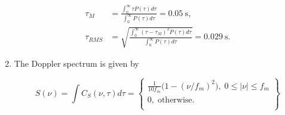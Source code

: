 \documentclass [a4paper, 11pt] {article}
\begin{document}
\begin{solution}
\begin{enumerate}
            \begin{align}
                \tau_M &= \frac{\int_0^\infty \tau P(\tau) d\tau}{\int_0^\infty P(\tau) d\tau} = \SI{0.05}{\second}, \\
                \tau_{RMS} & = \sqrt{\frac{\int_0^\infty (\tau - \tau_M)^2 P(\tau) d\tau}{\int_0^\infty P(\tau) d\tau}} = \SI{0.029}{\second}.
            \end{align}
            
            \item The Doppler spectrum is given by 
            
            \[
            S(\nu) = \int C_S(\nu, \tau) d\tau = \left\{
                        \begin{array}{ll}
                         \frac{1}{10 f_m}\big(1-(\nu/f_m)^2\big), \; 0 \leq |\nu| \leq f_m\\
                          0, \; \text{otherwise}. \\
                        \end{array}
                        \right\}
            \]
        \end{enumerate} 
   \end{solution}
        
   
\end{document}
